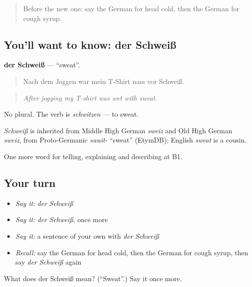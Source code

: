 \begin{quote}
Before the new one: say the German for head cold, then the German for cough syrup.
\end{quote}

\subsection*{You'll want to know: der Schweiß}
\textbf{der Schweiß} — \textquotedblleft{}sweat\textquotedblright{}.

\begin{quote}
Nach dem Joggen war mein T-Shirt nass vor Schweiß.
\end{quote}

\begin{quote}
\emph{After jogging my T-shirt was wet with sweat.}
\end{quote}

No plural. The verb is \emph{schwitzen} — to sweat.

\begin{cousinweb}
\emph{Schweiß} is inherited from Middle High German \emph{sweiz} and Old High German \emph{sweiz}, from Proto-Germanic \emph{swait-} \textquotedblleft{}sweat\textquotedblright{} (EtymDB); English \emph{sweat} is a cousin.
\end{cousinweb}

\begin{grammarlens}[title={What you've built}]
One more word for telling, explaining and describing at B1.
\end{grammarlens}

\subsection*{Your turn}
\begin{itemize}
\raggedright
  \item \emph{Say it:} \emph{der Schweiß}
  \item \emph{Say it:} \emph{der Schweiß}, once more
  \item \emph{Say it:} a sentence of your own with \emph{der Schweiß}
  \item \emph{Recall:} say the German for head cold, then the German for cough syrup, then say \emph{der Schweiß} again
\end{itemize}

\begin{tcolorbox}[breakable,colback=teal!4,colframe=teal!35!black,title={Before you move on}]
What does der Schweiß mean? (\textquotedblleft{}Sweat\textquotedblright{}.) Say it once more.
\end{tcolorbox}
